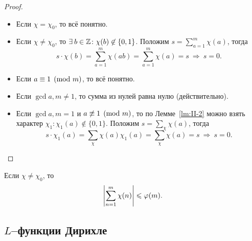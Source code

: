 \begin{proof}
\hfill
    \begin{statesp}
        \item
        \hfill
            \begin{itemize}[label={}]
                \item 
                    Если $\chi = \chi_0$, то всё понятно.
                \item
                    Если $\chi \ne \chi_0$, то $\exists b \in \ZZ\colon \chi(b) \not\in \{ 0, 1 \}$. Положим $s = \sum_{a=1}^m \chi(a)$, тогда 
                    \[
                        s \cdot \chi(b) 
                        = \sum_{a=1}^m \chi(ab) 
                        = \sum_{a=1}^m \chi(a) 
                        = s \ \Rightarrow \ s = 0.
                    \]
            \end{itemize}
        \item
        \hfill
            \begin{itemize}[label={}]
                \item
                    Если $a \equiv 1 \pmod m$, то всё понятно.
                \item
                    Если $\gcd{a, m} \ne 1$, то сумма из нулей равна нулю (действительно).
                \item
                    Если $\gcd{a, m} = 1$ и $a \not\equiv 1 \pmod{m}$, то по Лемме~\ref{lm:II-2} можно взять характер $\chi_1\colon \chi_1(a) \not\in \{ 0, 1 \}$. Положим $s = \sum_\chi \chi(a)$, тогда 
                    \[
                        s \cdot \chi_1(a) 
                        = \sum_\chi \chi(a)\chi_1(a) 
                        = \sum_\chi \chi(a) 
                        = s \ \Rightarrow \ s = 0.
                    \]
            \end{itemize}
    \end{statesp}
\end{proof}

\begin{ncorollary}
\label{crl:II-1}
    Если $\chi \ne \chi_0$, то 
    \[
        \left| \sum_{n=1}^m \chi(n) \right| \leqslant \varphi(m).
    \]
\end{ncorollary}


\subsection{\texorpdfstring{$L$--функции Дирихле}{L--функции Дирихле}}
\label{subsec:II-2}


